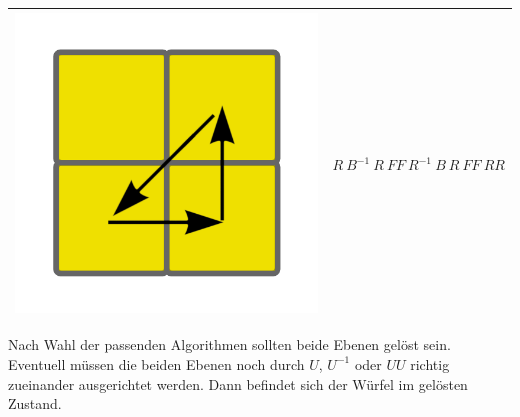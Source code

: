 \documentclass[12pt,a4paper, usenames, dvipsnames]{article}
\theoremstyle{mystyle}
\theoremstyle{definition}
\begin{document}
\begin{center}
\begin{tabular}{m{4cm} m{8cm}}
\includegraphics[scale=0.08]{corners3.png}   & $R \ B^{-1} \ R \ FF \ R^{-1} \ B \ R \ FF \ RR $ \\
\bottomrule
\end{tabular}
\end{center}

Nach Wahl der passenden Algorithmen sollten beide Ebenen gelöst sein. Eventuell müssen die beiden Ebenen noch durch $U$, $U^{-1}$ oder $UU$ richtig zueinander ausgerichtet werden. Dann befindet sich der Würfel im gelösten Zustand.


%
%
%
%
%
%
%
%
%
%
%
%
%
%
%
%
%
%
%
\newpage


\begin{singlespacing}
\listoffigures
\end{singlespacing}



\newpage


\printbibliography
\end{document}

